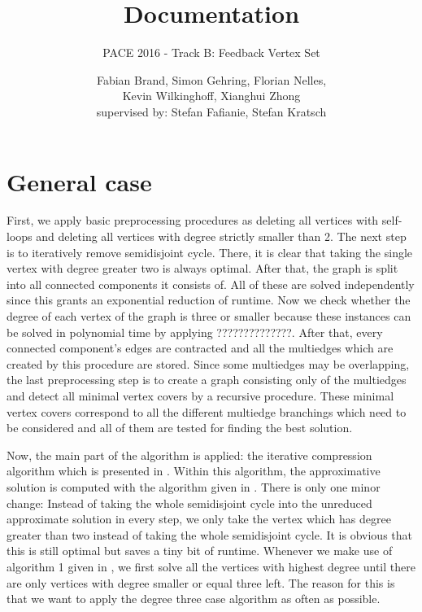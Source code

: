 \documentclass[11pt,a4paper]{scrartcl}
\begin{document}
\title{Documentation}
\subtitle{PACE 2016 - Track B: Feedback Vertex Set}
\author{Fabian Brand, Simon Gehring, Florian Nelles,\\ Kevin Wilkinghoff, Xianghui Zhong\\
	supervised by: Stefan Fafianie, Stefan Kratsch}
\maketitle

\section{General case}
First, we apply basic preprocessing procedures as deleting all vertices with self-loops and deleting all vertices with degree strictly smaller than 2. The next step is to iteratively remove semidisjoint cycle. There, it is clear that taking the single vertex with degree greater two is always optimal. After that, the graph is split into all connected components it consists of. All of these are solved independently since this grants an exponential reduction of runtime. Now we check whether the degree of each vertex of the graph is three or smaller because these instances can be solved in polynomial time by applying ??????????????. After that, every connected component's edges are contracted and all the multiedges which are created by this procedure are stored. Since some multiedges may be overlapping, the last preprocessing step is to create a graph consisting only of the multiedges and detect all minimal vertex covers by a recursive procedure. These minimal vertex covers correspond to all the different multiedge branchings which need to be considered and all of them are tested for finding the best solution.
\par 
Now, the main part of the algorithm is applied: the iterative compression algorithm which is presented in \cite{chen2008}. Within this algorithm, the approximative solution is computed with the algorithm given in \cite{bafna1999}. There is only one minor change: Instead of taking the whole semidisjoint cycle into the unreduced approximate solution in every step, we only take the vertex which has degree greater than two instead of taking the whole semidisjoint cycle. It is obvious that this is still optimal but saves a tiny bit of runtime. Whenever we make use of algorithm 1 given in \cite{chen2008}, we first solve all the vertices with highest degree until there are only vertices with degree smaller or equal three left. The reason for this is that we want to apply the degree three case algorithm as often as possible.
\end{document}
